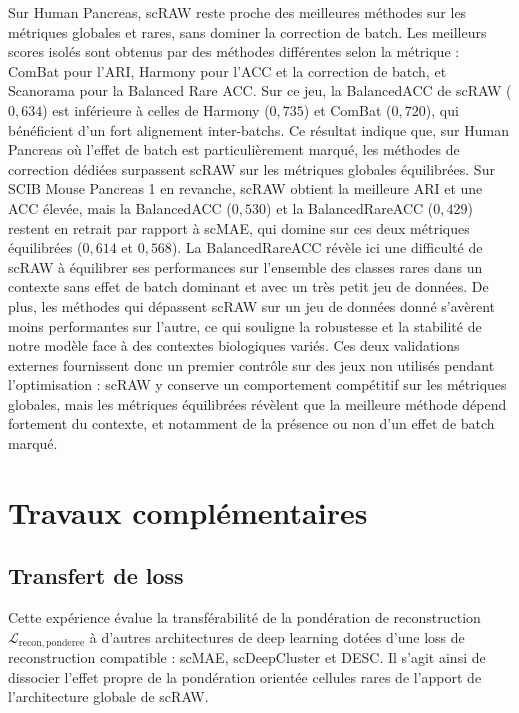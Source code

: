 Sur Human Pancreas, scRAW reste proche des meilleures méthodes sur les métriques globales et rares, sans dominer la correction de batch. Les meilleurs scores isolés sont obtenus par des méthodes différentes selon la métrique : ComBat pour l'ARI, Harmony pour l'ACC et la correction de batch, et Scanorama pour la Balanced Rare ACC. Sur ce jeu, la BalancedACC de scRAW ($0{,}634$) est inférieure à celles de Harmony ($0{,}735$) et ComBat ($0{,}720$), qui bénéficient d'un fort alignement inter-batchs. Ce résultat indique que, sur Human Pancreas où l'effet de batch est particulièrement marqué, les méthodes de correction dédiées surpassent scRAW sur les métriques globales équilibrées. Sur SCIB Mouse Pancreas 1 en revanche, scRAW obtient la meilleure ARI et une ACC élevée, mais la BalancedACC ($0{,}530$) et la BalancedRareACC ($0{,}429$) restent en retrait par rapport à scMAE, qui domine sur ces deux métriques équilibrées ($0{,}614$ et $0{,}568$). La BalancedRareACC révèle ici une difficulté de scRAW à équilibrer ses performances sur l'ensemble des classes rares dans un contexte sans effet de batch dominant et avec un très petit jeu de données. De plus, les méthodes qui dépassent scRAW sur un jeu de données donné s'avèrent moins performantes sur l'autre, ce qui souligne la robustesse et la stabilité de notre modèle face à des contextes biologiques variés. Ces deux validations externes fournissent donc un premier contrôle sur des jeux non utilisés pendant l'optimisation : scRAW y conserve un comportement compétitif sur les métriques globales, mais les métriques équilibrées révèlent que la meilleure méthode dépend fortement du contexte, et notamment de la présence ou non d'un effet de batch marqué.
\section{Travaux complémentaires}


\subsection{Transfert de loss}

Cette expérience évalue la transférabilité de la pondération de reconstruction \(\mathcal{L}_{\mathrm{recon,ponderee}}\) à d'autres architectures de deep learning dotées d'une loss de reconstruction compatible : scMAE, scDeepCluster et DESC. Il s'agit ainsi de dissocier l'effet propre de la pondération orientée cellules rares de l'apport de l'architecture globale de scRAW.

